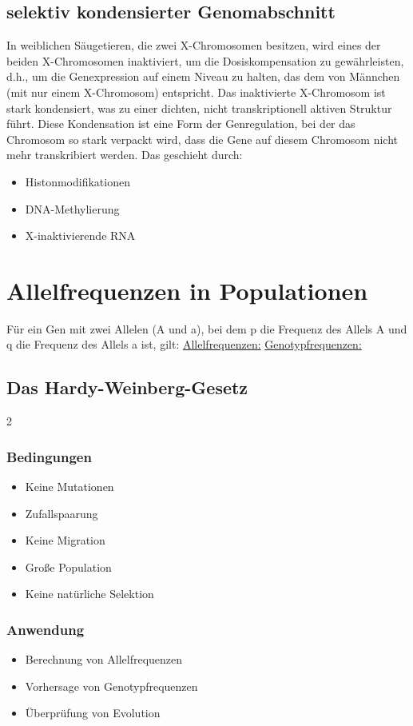 \documentclass{article}
\begin{document}
\subsection*{selektiv kondensierter Genomabschnitt} 
In weiblichen Säugetieren, die zwei X-Chromosomen besitzen, wird eines der beiden X-Chromosomen inaktiviert, um die Dosiskompensation zu gewährleisten, d.h., um die Genexpression auf einem Niveau zu halten, das dem von Männchen (mit nur einem X-Chromosom) entspricht. \newline
Das inaktivierte X-Chromosom ist stark kondensiert, was zu einer dichten, nicht transkriptionell aktiven Struktur führt. Diese Kondensation ist eine Form der Genregulation, bei der das Chromosom so stark verpackt wird, dass die Gene auf diesem Chromosom nicht mehr transkribiert werden. \newline
Das geschieht durch: 
\begin{itemize}
    \item Histonmodifikationen
    \item DNA-Methylierung
    \item X-inaktivierende RNA
\end{itemize}
\section*{Allelfrequenzen in Populationen}
Für ein Gen mit zwei Allelen (A und a), bei dem p die Frequenz des Allels A und q die Frequenz des Allels a ist, gilt: \newline \newline
\underline{Allelfrequenzen:}  \newline
\underline{Genotypfrequenzen:} 

\subsection*{Das Hardy-Weinberg-Gesetz}
\begin{multicols}{2}
\subsubsection*{Bedingungen} 
\begin{itemize}
    \item Keine Mutationen
    \item Zufallspaarung
    \item Keine Migration
    \item Große Population
    \item Keine natürliche Selektion
\end{itemize}
\columnbreak
\subsubsection*{Anwendung} 
\begin{itemize}
    \item Berechnung von Allelfrequenzen
    \item Vorhersage von Genotypfrequenzen
    \item Überprüfung von Evolution
\end{itemize}
\end{multicols}
\newpage
\end{document}
